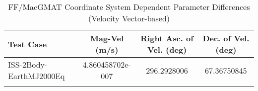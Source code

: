 \begin{table}[htbp!]
\centering
\caption{ FF/MacGMAT Coordinate System Dependent Parameter Differences (Velocity Vector-based)}
      \begin{tabular}{lccc}
      \hline\hline
          Test Case & Mag-Vel (m/s) & Right Asc. of Vel. (deg) & Dec. of Vel. (deg) \\
         \hline
         ISS-2Body-EarthMJ2000Eq & 4.860458702e-007 & 296.2928006 & 67.36750845 \\
      \hline\hline
      \label{Table: FF-MacGMAT CS Parameters Set 4} 
\end{tabular}
\end{table}
